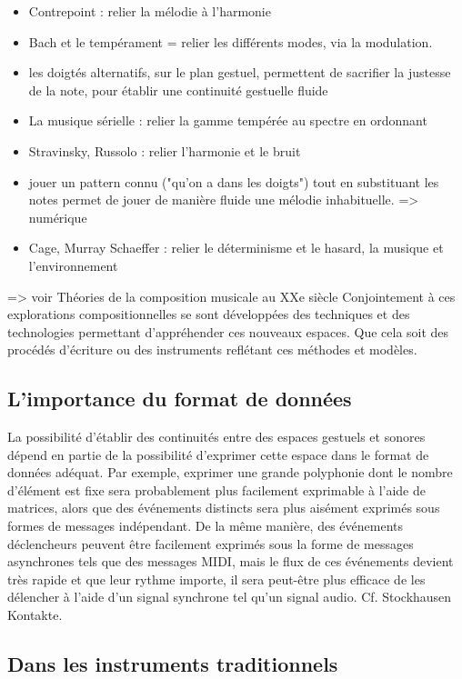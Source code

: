 \vspace{-1em}
\begin{itemize}[noitemsep]
\item Contrepoint : relier la mélodie à l'harmonie 
\item Bach et le tempérament = relier les différents modes, via la modulation.
\item les doigtés alternatifs, sur le plan gestuel, permettent de sacrifier la justesse de la note, pour établir une continuité gestuelle fluide
\item La musique sérielle : relier la gamme tempérée au spectre en ordonnant 
\item Stravinsky, Russolo : relier l’harmonie et le bruit 
\item jouer un pattern connu ("qu'on a dans les doigts") tout en substituant les notes permet de jouer de manière fluide une mélodie inhabituelle. => numérique
\item Cage, Murray Schaeffer : relier le déterminisme et le hasard, la musique et l’environnement 
\end{itemize}

=> voir Théories de la composition musicale au XXe siècle 
Conjointement à ces explorations compositionnelles se sont développées des techniques et des technologies permettant d’appréhender ces nouveaux espaces. Que cela soit des procédés d’écriture ou des instruments reflétant ces méthodes et modèles.

\subsection{L'importance du format de données}
La possibilité d'établir des continuités entre des espaces gestuels et sonores dépend en partie de la possibilité d'exprimer cette espace dans le format de données adéquat. Par exemple, exprimer une grande polyphonie dont le nombre d'élément est fixe sera probablement plus facilement exprimable à l'aide de matrices, alors que des événements distincts sera plus aisément exprimés sous formes de messages indépendant. De la même manière, des événements déclencheurs peuvent être facilement exprimés sous la forme de messages asynchrones tels que des messages MIDI, mais le flux de ces événements devient très rapide et que leur rythme importe, il sera peut-être plus efficace de les délencher à l'aide d'un signal synchrone tel qu'un signal audio. Cf. Stockhausen Kontakte.


\subsection{Dans les instruments traditionnels}

